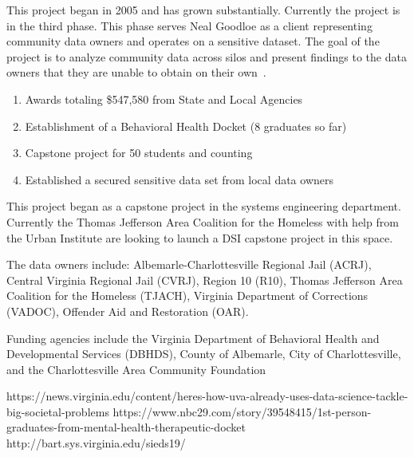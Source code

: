 This project began in 2005 and has grown substantially. Currently the project is in the third phase. This phase serves Neal Goodloe as a client representing community data owners and operates on a sensitive dataset. The goal of the project is to analyze community data across silos and present findings to the data owners that they are unable to obtain on their own~\cite{ref:uva}.

\begin{enumerate}
\item Awards totaling \$547,580 from State and Local Agencies
\item Establishment of a Behavioral Health Docket (8 graduates so far) \cite{ref:docket}
\item Capstone project for 50 students and counting~\cite{ref:sieds}
\item Established a secured sensitive data set from local data owners
\end{enumerate}

This project began as a capstone project in the systems engineering department. Currently the Thomas Jefferson Area Coalition for the Homeless with help from the Urban Institute are looking to launch a DSI capstone project in this space.

The data owners include: Albemarle-Charlottesville Regional Jail (ACRJ), Central Virginia Regional Jail (CVRJ), Region 10 (R10), Thomas Jefferson Area Coalition for the Homeless (TJACH), Virginia Department of Corrections (VADOC), Offender Aid and Restoration (OAR).

Funding agencies include the Virginia Department of Behavioral Health and Developmental Services (DBHDS), County of Albemarle, City of Charlottesville, and the Charlottesville Area Community Foundation

\pagebreak

\begin{thebibliography}{99}
 https://news.virginia.edu/content/heres-how-uva-already-uses-data-science-tackle-big-societal-problems
 https://www.nbc29.com/story/39548415/1st-person-graduates-from-mental-health-therapeutic-docket
 http://bart.sys.virginia.edu/sieds19/
\end{thebibliography}
